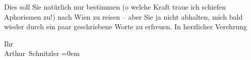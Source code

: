\pstart
           Dies soll Sie natürlich nur bestimmen (o welche Kraft traue ich schiefen Aphorismen
               zu!) nach Wien zu reisen – aber Sie ja nicht
               abhalten, mich bald wieder durch ein paar geschriebene Worte zu erfreuen. In
               herzlicher Verehrung\pend
           
\pstart
           Ihr{\\[\baselineskip]}\spacefill\mbox{Arthur Schnitzler}\pend
           \leftskip=0em{}\endnumbering{}  \newcommand{\dateiname}{L02000}\newcommand{\titel}{Arthur Schnitzler an Georg Brandes, 19. 1. 1911}\newcommand{\editorInnen}{Martin Anton Müller und Gerd-Hermann Susen}

